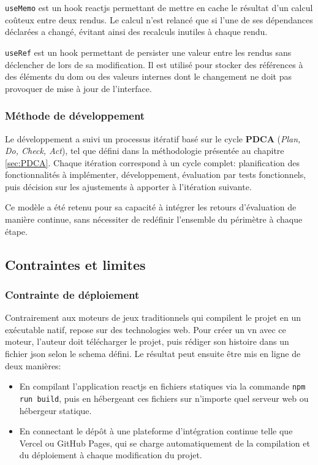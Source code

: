 \texttt{useMemo} est un \gls{hook} \gls{reactjs} permettant de mettre en cache le résultat d'un calcul coûteux entre deux \glspl{rendu}. Le calcul n'est relancé que si l'une de ses dépendances déclarées a changé, évitant ainsi des recalculs inutiles à chaque \gls{rendu}.

\texttt{useRef} est un \gls{hook} permettant de persister une valeur entre les \glspl{rendu} sans déclencher de  lors de sa modification. Il est utilisé pour stocker des références à des éléments du \acrshort{dom} ou des valeurs internes dont le changement ne doit pas provoquer de mise à jour de l'interface.


\subsubsection{Méthode de développement}

Le développement a suivi un processus itératif basé sur le cycle \textbf{PDCA} (\textit{Plan, Do, Check, Act}), tel que défini dans la méthodologie présentée au chapitre \ref{sec:PDCA}. Chaque itération correspond à un cycle complet: planification des fonctionnalités à implémenter, développement, évaluation par tests fonctionnels, puis décision sur les ajustements à apporter à l'itération suivante.

Ce modèle a été retenu pour sa capacité à intégrer les retours d'évaluation de manière continue, sans nécessiter de redéfinir l'ensemble du périmètre à chaque étape.


\subsection{Contraintes et limites}

\subsubsection{Contrainte de déploiement}

Contrairement aux moteurs de jeux traditionnels qui compilent le projet en un exécutable natif, \nsits repose sur des technologies web. Pour créer un \gls{vn} avec ce moteur, l'auteur doit télécharger le projet, puis rédiger son histoire dans un fichier \gls{json} selon le \gls{schema} défini. Le résultat peut ensuite être mis en ligne de deux manières:

\begin{itemize}
    \item En compilant l'application \gls{reactjs} en fichiers statiques via la commande \texttt{npm run build}, puis en hébergeant ces fichiers sur n'importe quel serveur web ou hébergeur statique.
    \item En connectant le dépôt à une plateforme d'intégration continue telle que Vercel ou GitHub Pages, qui se charge automatiquement de la compilation et du déploiement à chaque modification du projet.
\end{itemize}

